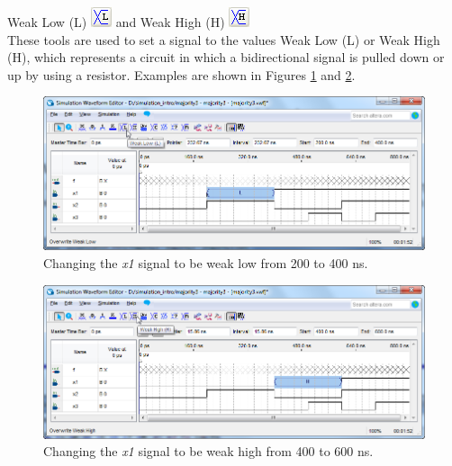 \documentclass[11pt, twoside, pdftex]{article}
\begin{document}
\begin{description}
	\item {\sf Weak Low (L)} \hbox{\includegraphics[scale=0.7]{figures/appendix/icon7.png}} {\sf and Weak High (H)} \hbox{\includegraphics[scale=0.7]{figures/appendix/icon8.png}}\\
	These tools are used to set a signal to the values {\sf Weak Low (L)} or {\sf Weak High (H)}, which represents 
	a circuit in which a bidirectional signal is pulled down or up by using a resistor. Examples are shown in 
	Figures \ref{fig:fig7} and \ref{fig:fig8}.
	\begin{figure}[H]
	   \begin{center}
	      \includegraphics[scale=0.65]{figures/appendix/figure7.png}
	   \caption{Changing the {\it x1} signal to be weak low from 200 to 400 ns.} 
		 \label{fig:fig7}
		 \end{center}
	\end{figure}		
	\begin{figure}[H]
	   \begin{center}
	      \includegraphics[scale=0.65]{figures/appendix/figure8.png}
	   \caption{Changing the {\it x1} signal to be weak high from 400 to 600 ns.} 
		 \label{fig:fig8}
		 \end{center}
	\end{figure}
	

\end{description}
\end{document}
